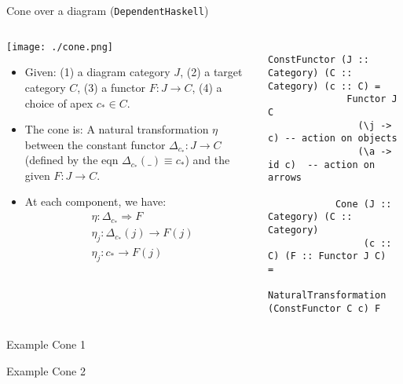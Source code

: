\documentclass[8pt]{beamer}
\newcommand{\nt}{\Rightarrow}
\begin{document}
\begin{frame}[fragile]{Cone over a diagram (\texttt{DependentHaskell})}
    \begin{columns}[T] %
        \begin{column}{.48\textwidth}
            \texttt{[image: ./cone.png]}
    {\footnotesize
    \begin{itemize}
        \item Given: (1) a diagram category $J$, (2) a target category $C$, (3) a functor $F: J \to C$, (4)
              a choice of apex $c_* \in C$. 
        \item The cone is: A natural transformation $\eta$ between the constant functor $\Delta_{c_*}: J \to C$ 
            (defined by the eqn $\Delta_{c_*}(\_) \equiv c_*$) and the given $F: J \to C$. 
        \item At each component, we have:
            \begin{align*}
                &\eta: \Delta_{c_*} \nt F \\
                &\eta_j: \Delta_{c_*}(j) \to F(j) \\
                &\eta_j: c_* \to F(j) \\
            \end{align*}
    \end{itemize}
    }
    \end{column}

    \begin{column}{.6\textwidth}
        {\tiny
        \begin{verbatim}
            ConstFunctor (J :: Category) (C :: Category) (c :: C) = 
              Functor J C
                (\j -> c) -- action on objects
                (\a -> id c)  -- action on arrows

            Cone (J :: Category) (C :: Category) 
                 (c :: C) (F :: Functor J C)  = 
                   NaturalTransformation (ConstFunctor C c) F
        \end{verbatim}
        }
    \end{column}
    \end{columns}
\end{frame}

\begin{frame}{Example Cone 1}
\end{frame}

\begin{frame}{Example Cone 2}
\end{frame}
\end{document}
